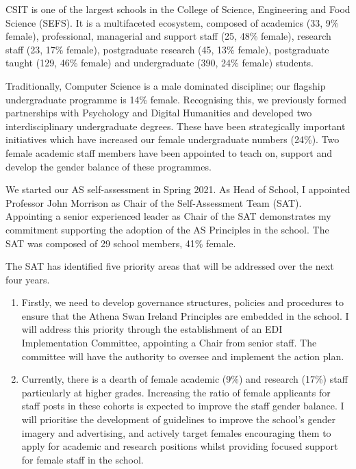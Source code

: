 \begin{mdframed}
CSIT is one of the largest schools in the College of Science, Engineering and Food Science (SEFS).  It is a multifaceted ecosystem, composed of academics (33, 9\% female), professional, managerial and support staff (25, 48\% female), research staff (23, 17\% female), postgraduate research (45, 13\% female), postgraduate taught (129, 46\% female) and undergraduate (390, 24\% female) students. 

Traditionally, Computer Science is a male dominated discipline; our flagship undergraduate programme is 14\% female.  Recognising this, we previously formed partnerships with Psychology and Digital Humanities and developed two interdisciplinary undergraduate degrees.  These have been strategically important initiatives which have increased our female undergraduate numbers (24\%). Two female academic staff members have been appointed to teach on, support and develop the gender balance of these programmes. 

We started our AS self-assessment in Spring 2021.  As Head of School, I appointed Professor John Morrison as Chair of the Self-Assessment Team (SAT). Appointing a senior experienced leader as Chair of the SAT demonstrates my commitment supporting the adoption of the AS Principles in the school.  The SAT was composed of 29 school members, 41\% female.  

The SAT has identified five priority areas that will be addressed over the next four years. 

\begin{enumerate}

\item Firstly, we need to develop governance structures, policies and procedures to ensure that the Athena Swan Ireland Principles are embedded in the school.  I will address this priority through the establishment of an EDI Implementation Committee, appointing a Chair from senior staff.  The committee will have the authority to oversee and implement the action plan. 

\item Currently, there is a dearth of female academic (9\%) and research (17\%) staff particularly at higher grades.  Increasing the ratio of female applicants for staff posts in these cohorts is expected to improve the staff gender balance.  I will prioritise the development of guidelines to improve the school's gender imagery and advertising, and actively target females encouraging them to apply for academic and research positions whilst providing focused support for female staff in the school. 


\end{enumerate}
\end{mdframed}
